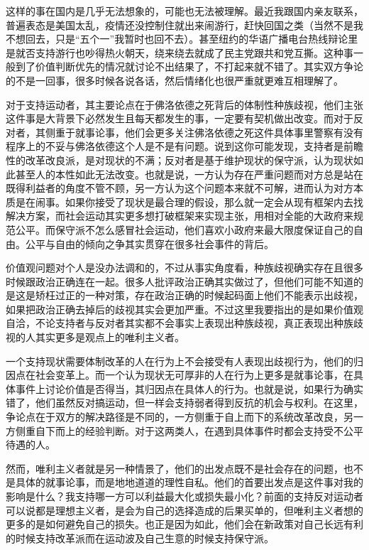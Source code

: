 \documentclass[]{book}
\begin{document}
这样的事在国内是几乎无法想象的，可能也无法被理解。最近我跟国内亲友联系，普遍表态是美国太乱，疫情还没控制住就出来闹游行，赶快回国之类（当然不是我不想回去，只是``五个一''我暂时也回不去）。甚至纽约的华语广播电台热线辩论里是就否支持游行也吵得热火朝天，绕来绕去就成了民主党跟共和党互撕。这种事一般到了价值判断优先的情况就讨论不出结果了，不打起来就不错了。其实双方争论的不是一回事，很多时候各说各话，然后情绪化也很严重就更难互相理解了。

对于支持运动者，其主要论点在于佛洛依德之死背后的体制性种族歧视，他们主张这件事是大背景下必然发生且每天都发生的事，一定要有契机做出改变。而对于反对者，其侧重于就事论事，他们会更多关注佛洛依德之死这件具体事里警察有没有程序上的不妥与佛洛依德这个人是不是有问题。说到这你可能发现，支持者是前瞻性的改革改良派，是对现状的不满；反对者是基于维护现状的保守派，认为现状如此甚至人的本性如此无法改变。也就是说，一方认为存在严重问题而对方总是站在既得利益者的角度不管不顾，另一方认为这个问题本来就不可解，进而认为对方本质是在闹事。如果你接受了现状是最合理的假设，那么就一定会从现有框架内去找解决方案，而社会运动其实更多想打破框架来实现主张，用相对全能的大政府来规范公平。而保守派不怎么感冒社会运动，他们喜欢小政府来最大限度保证自己的自由。公平与自由的倾向之争其实贯穿在很多社会事件的背后。

价值观问题对个人是没办法调和的，不过从事实角度看，种族歧视确实存在且很多时候跟政治正确连在一起。很多人批评政治正确其实做过了，但他们可能不知道的是这是矫枉过正的一种对策，存在政治正确的时候起码面上他们不能表示出歧视，如果把政治正确去掉后的歧视其实会更加严重。不过这里我要指出的是如果价值观自洽，不论支持者与反对者其实都不会事实上表现出种族歧视，真正表现出种族歧视的人其实更多是观点上的唯利主义者。

一个支持现状需要体制改革的人在行为上不会接受有人表现出歧视行为，他们的归因点在社会变革上。而一个认为现状无可厚非的人在行为上更多是就事论事，在具体事件上讨论价值是否得当，其归因点在具体人的行为。也就是说，如果行为确实错了，他们虽然反对搞运动，但一样会支持弱者得到反抗的机会与权利。在这里，争论点在于双方的解决路径是不同的，一方侧重于自上而下的系统改革改良，另一方侧重自下而上的经验判断。对于这两类人，在遇到具体事件时都会支持受不公平待遇的人。

然而，唯利主义者就是另一种情景了，他们的出发点既不是社会存在的问题，也不是具体的就事论事，而是地地道道的理性自私。他们的首要出发点是这件事对我的影响是什么？我支持哪一方可以利益最大化或损失最小化？前面的支持反对运动者可以说都是理想主义者，是会为自己的选择造成的后果买单的，但唯利主义者想的更多的是如何避免自己的损失。也正是因为如此，他们会在新政策对自己长远有利的时候支持改革派而在运动波及自己生意的时候支持保守派。
\end{document}
